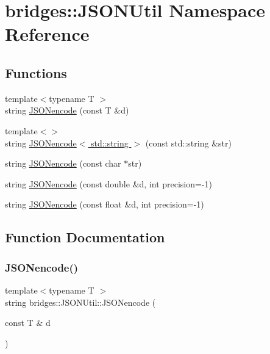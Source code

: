 \hypertarget{namespacebridges_1_1_j_s_o_n_util}{}\section{bridges\+:\+:J\+S\+O\+N\+Util Namespace Reference}
\label{namespacebridges_1_1_j_s_o_n_util}
\subsection*{Functions}
\begin{DoxyCompactItemize}
\item 
{\footnotesize template$<$typename T $>$ }\\string \hyperlink{namespacebridges_1_1_j_s_o_n_util_aaf500e70dc1b2a9fd1284e386af1be63}{J\+S\+O\+Nencode} (const T \&d)
\item 
{\footnotesize template$<$$>$ }\\string \hyperlink{namespacebridges_1_1_j_s_o_n_util_a2b258507ccdf822ecebbbbb0b66fb06d}{J\+S\+O\+Nencode$<$ std\+::string $>$} (const std\+::string \&str)
\item 
string \hyperlink{namespacebridges_1_1_j_s_o_n_util_a8167097b34730f71a1b395a76eecd550}{J\+S\+O\+Nencode} (const char $\ast$str)
\item 
string \hyperlink{namespacebridges_1_1_j_s_o_n_util_a3ba781fbae468d93158efbdf3492149c}{J\+S\+O\+Nencode} (const double \&d, int precision=-\/1)
\item 
string \hyperlink{namespacebridges_1_1_j_s_o_n_util_a8372aa47b00ae65edbe27747c98d106a}{J\+S\+O\+Nencode} (const float \&d, int precision=-\/1)
\end{DoxyCompactItemize}


\subsection{Function Documentation}
\mbox{\label{namespacebridges_1_1_j_s_o_n_util_aaf500e70dc1b2a9fd1284e386af1be63}} 
\subsubsection{\texorpdfstring{J\+S\+O\+Nencode()}{JSONencode()}\hspace{0.1cm}{\footnotesize\ttfamily [1/4]}}
{\footnotesize\ttfamily template$<$typename T $>$ \\
string bridges\+::\+J\+S\+O\+N\+Util\+::\+J\+S\+O\+Nencode (\begin{DoxyParamCaption}\item[{const T \&}]{d }\end{DoxyParamCaption})\hspace{0.3cm}{\ttfamily [inline]}}

